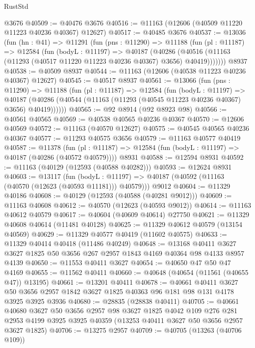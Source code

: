 \begin{lexlean}{RustStd}
\begin{coremodule}
    @3676
@40509 := @40476 @3676
@40516 := @11163 (@12606 (@40509 @11220 @11223 @40236 @40367) @12627)
@40517 := @40485 @3676
@40537 := @13036
    (fun (hn : @41) =>
    @11291
      (fun (pns : @11290) =>
      @11188
        (fun (pl : @11187) =>
        @12584
          (fun (bodyL : @11197) =>
          @40187
            (@40286
              (@40516 (@11163 (@11293 (@40517 @11220 @11223 @40236 @40367) @3656) @40419)))))))
    @8937
@40538 := @40509 @8937
@40544 := @11163 (@12606 (@40538 @11223 @40236 @40367) @12627)
@40545 := @40517 @8937
@40561 := @13066
    (fun (pns : @11290) =>
    @11188
      (fun (pl : @11187) =>
      @12584
        (fun (bodyL : @11197) =>
        @40187 (@40286 (@40544 (@11163 (@11293 (@40545 @11223 @40236 @40367) @3656) @40419))))))
@40565 := @92 @8914 (@92 @8923 @98)
@40566 := @40561 @40565
@40569 := @40538 @40565 @40236 @40367
@40570 := @12606 @40569
@40572 := @11163 (@40570 @12627)
@40575 := @40545 @40565 @40236 @40367
@40577 := @11293 @40575 @3656
@40579 := @11163 @40577 @40419
@40587 := @11378
    (fun (pl : @11187) => @12584 (fun (bodyL : @11197) => @40187 (@40286 (@40572 @40579))))
    @8931
@40588 := @12594 @8931
@40592 := @11163 (@40129 (@12593 (@40588 @40282)))
@40593 := @12624 @8931
@40603 := @13117
    (fun (bodyL : @11197) => @40187 (@40592 (@11163 (@40570 (@12623 (@40593 @11181))) @40579)))
    @9012
@40604 := @11329 @40186
@40608 := @40129 (@12593 (@40588 (@40281 @9012)))
@40609 := @11163 @40608
@40612 := @40570 (@12623 (@40593 @9012))
@40614 := @11163 @40612 @40579
@40617 := @40604 (@40609 @40614) @27750
@40621 := @11329 @40608 @40614 (@11481 @40128)
@40625 := @11329 @40612 @40579 (@13154 @40569)
@40629 := @11329 @40577 @40419 (@11602 @40575)
@40633 := @11329 @40414 @40418 (@11486 @40249)
@40648 := @13168
    @40411
    @3627
    @3627
    @1825
    @50
    @3656
    @267
    @2957
    @1843
    @4169
    @40364
    @98
    @4133
    @8957
    @4139
@40650 := @11553 @40411 @3627
@40654 := @40650 @47 @50 @47 @4169
@40655 := @11562 @40411
@40660 := @40648 (@40654 (@11561 (@40655 @47)) @13195)
@40661 := @13201 @40411
@40678 := @40661
    @40411
    @3627
    @50
    @3656
    @2957
    @1842
    @3627
    @1825
    @40363
    @96
    @181
    @98
    @131
    @4178
    @3925
    @3925
    @3936
@40680 := @28835 (@28838 @40411)
@40705 := @40661
    @40680
    @3627
    @50
    @3656
    @2957
    @98
    @3627
    @1825
    @4042
    @109
    @276
    @281
    @2953
    @4199
    @3925
    @3925
    @40359
    (@13253 @40411 @3627 @50 @3656 @2957 @3627 @1825)
@40706 := @13275 @2957
@40709 := @40705 (@13263 (@40706 @109))

\end{coremodule}
\end{lexlean}
